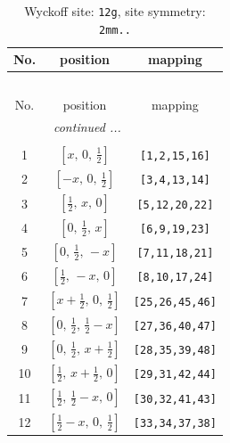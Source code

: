 \documentclass[fleqn,8pt]{jsarticle}
\begin{document}
\begin{longtable}{ccc}
\caption{Wyckoff site: {\tt 12g}, site symmetry: {\tt 2mm..}}
 \\
 \hline \hline
No. & position & mapping \\ \hline \endfirsthead

\multicolumn{2}{l}{\tablename\ \thetable{}} \\
 \hline \hline
No. & position & mapping \\ \hline \endhead

 \hline \hline
\multicolumn{2}{r}{\footnotesize\it continued ...} \\ \endfoot

 \hline \hline
\multicolumn{2}{r}{} \\ \endlastfoot

1 & $\left[ x,\, 0,\, \frac{1}{2} \right]$ & {\tt [1,2,15,16]} \\ \hline
2 & $\left[ - x,\, 0,\, \frac{1}{2} \right]$ & {\tt [3,4,13,14]} \\ \hline
3 & $\left[ \frac{1}{2},\, x,\, 0 \right]$ & {\tt [5,12,20,22]} \\ \hline
4 & $\left[ 0,\, \frac{1}{2},\, x \right]$ & {\tt [6,9,19,23]} \\ \hline
5 & $\left[ 0,\, \frac{1}{2},\, - x \right]$ & {\tt [7,11,18,21]} \\ \hline
6 & $\left[ \frac{1}{2},\, - x,\, 0 \right]$ & {\tt [8,10,17,24]} \\ \hline
7 & $\left[ x + \frac{1}{2},\, 0,\, \frac{1}{2} \right]$ & {\tt [25,26,45,46]} \\ \hline
8 & $\left[ 0,\, \frac{1}{2},\, \frac{1}{2} - x \right]$ & {\tt [27,36,40,47]} \\ \hline
9 & $\left[ 0,\, \frac{1}{2},\, x + \frac{1}{2} \right]$ & {\tt [28,35,39,48]} \\ \hline
10 & $\left[ \frac{1}{2},\, x + \frac{1}{2},\, 0 \right]$ & {\tt [29,31,42,44]} \\ \hline
11 & $\left[ \frac{1}{2},\, \frac{1}{2} - x,\, 0 \right]$ & {\tt [30,32,41,43]} \\ \hline
12 & $\left[ \frac{1}{2} - x,\, 0,\, \frac{1}{2} \right]$ & {\tt [33,34,37,38]} \\
\end{longtable}
\renewcommand{\arraystretch}{1.2}
\end{document}
